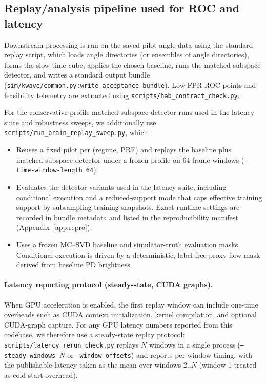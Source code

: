 \documentclass[11pt]{article}
\DeclareRobustCommand{\path}[1]{\nolinkurl{#1}}
\newif\ifPAPERONLY
\newcommand{\SuppOrApp}[1]{\ifPAPERONLY Supplementary Material\else Appendix~\ref{#1}\fi}
\begin{document}
\subsection{Replay/analysis pipeline used for ROC and latency}
Downstream processing is run on the saved pilot angle data using the standard replay script, which loads angle directories (or ensembles of angle directories), forms the slow-time cube, applies the chosen baseline, runs the matched-subspace detector, and writes a standard output bundle (\path{sim/kwave/common.py:write_acceptance_bundle}). Low-FPR ROC points and feasibility telemetry are extracted using \path{scripts/hab_contract_check.py}.

For the conservative-profile matched-subspace detector runs used in the latency suite and robustness sweeps, we additionally use \path{scripts/run_brain_replay_sweep.py}, which:
\begin{itemize}[nosep]
  \item Reuses a fixed pilot per (regime, PRF) and replays the baseline plus matched-subspace detector under a frozen profile on 64-frame windows (\texttt{--time-window-length 64}).
  \item Evaluates the detector variants used in the latency suite, including conditional execution and a reduced-support mode that caps effective training support by subsampling training snapshots. Exact runtime settings are recorded in bundle metadata and listed in the reproducibility manifest (\SuppOrApp{app:repro}).
  \item Uses a frozen MC--SVD baseline and simulator-truth evaluation masks. Conditional execution is driven by a deterministic, label-free proxy flow mask derived from baseline PD brightness.
\end{itemize}

\paragraph{Latency reporting protocol (steady-state, CUDA graphs).}
When GPU acceleration is enabled, the first replay window can include one-time overheads such as CUDA context initialization, kernel compilation, and optional CUDA-graph capture. For any GPU latency numbers reported from this codebase, we therefore use a steady-state replay protocol: \path{scripts/latency_rerun_check.py} replays $N$ windows in a single process (\texttt{--steady-windows $N$} or \texttt{--window-offsets}) and reports per-window timing, with the publishable latency taken as the mean over windows 2..$N$ (window 1 treated as cold-start overhead).
\end{document}
